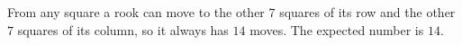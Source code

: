 From any square a rook can move to the other $7$ squares of its row and the other $7$ squares of its column, so it always has $14$ moves. The expected number is $\boxed{14}$.

